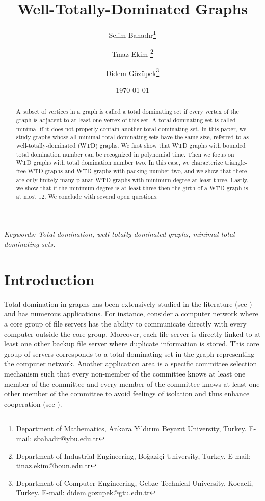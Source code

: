 \documentclass[11pt]{article}
\theoremstyle{definition}
\begin{document}
\title{Well-Totally-Dominated Graphs}
\author{
Selim Bahadır\thanks{Department of Mathematics, Ankara Yıldırım Beyazıt University, Turkey. E-mail: sbahadir@ybu.edu.tr}
\and
Tınaz Ekim \thanks{Department of Industrial Engineering, Boğaziçi University, Turkey. E-mail: tinaz.ekim@boun.edu.tr}
\and
Didem Gözüpek\thanks{Department of Computer Engineering, Gebze Technical University, Kocaeli, Turkey. E-mail: didem.gozupek@gtu.edu.tr}\and
}
\date{\today}

\maketitle
{} \setcounter{page}{1}



 \setcounter{page}{1}

\begin{abstract}
\noindent
A subset of vertices in a graph is called a total dominating set if every vertex of the graph is adjacent to at least one vertex of this set. A total dominating set is called minimal if it does not properly contain another total dominating set. In this paper, we study graphs whose all minimal total dominating sets have the same size, referred to as well-totally-dominated (WTD) graphs. We first show that WTD graphs with bounded total domination number can be recognized  in polynomial time. Then we focus on WTD graphs with total domination number two. In this case, we characterize triangle-free WTD graphs and WTD graphs with packing number two, and we show that there are only finitely many planar WTD graphs with minimum degree at least three. Lastly, we show that if the minimum degree is at least three then the girth of a WTD graph is at most 12. We conclude with several open  questions.
\end{abstract}

\noindent
{\it Keywords: Total domination, well-totally-dominated graphs, minimal total dominating sets.} \\



\section{Introduction}
\label{sec:intro}


Total domination in graphs has been extensively studied in the literature (see \cite{HeYe13}) and has numerous applications. For instance, consider a computer network where a core group of file servers has the ability to communicate directly with every computer outside the core group. Moreover, each file server is directly linked to at least one other backup file server where duplicate information is stored. This core group of servers corresponds to a total dominating set in the graph representing the computer network. Another application area is a specific committee selection mechanism such that every non-member of the committee knows at least one member of the committee and every member of the committee knows at least one other member of the committee to avoid feelings of isolation and thus enhance cooperation (see \cite{haynes:1998}). 
\end{document}
